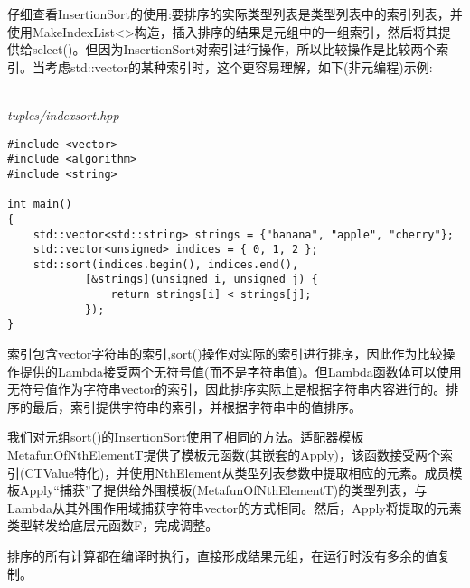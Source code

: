 仔细查看InsertionSort的使用:要排序的实际类型列表是类型列表中的索引列表，并使用MakeIndexList<>构造，插入排序的结果是元组中的一组索引，然后将其提供给select()。但因为InsertionSort对索引进行操作，所以比较操作是比较两个索引。当考虑std::vector的某种索引时，这个更容易理解，如下(非元编程)示例:

\hspace*{\fill} \\ %
\noindent
\textit{tuples/indexsort.hpp}
\begin{lstlisting}[style=styleCXX]
#include <vector>
#include <algorithm>
#include <string>

int main()
{
	std::vector<std::string> strings = {"banana", "apple", "cherry"};
	std::vector<unsigned> indices = { 0, 1, 2 };
	std::sort(indices.begin(), indices.end(),
			[&strings](unsigned i, unsigned j) {
				return strings[i] < strings[j];
			});
}
\end{lstlisting}

索引包含vector字符串的索引,sort()操作对实际的索引进行排序，因此作为比较操作提供的Lambda接受两个无符号值(而不是字符串值)。但Lambda函数体可以使用无符号值作为字符串vector的索引，因此排序实际上是根据字符串内容进行的。排序的最后，索引提供字符串的索引，并根据字符串中的值排序。

我们对元组sort()的InsertionSort使用了相同的方法。适配器模板MetafunOfNthElementT提供了模板元函数(其嵌套的Apply)，该函数接受两个索引(CTValue特化)，并使用NthElement从类型列表参数中提取相应的元素。成员模板Apply“捕获”了提供给外围模板(MetafunOfNthElementT)的类型列表，与Lambda从其外围作用域捕获字符串vector的方式相同。然后，Apply将提取的元素类型转发给底层元函数F，完成调整。

排序的所有计算都在编译时执行，直接形成结果元组，在运行时没有多余的值复制。

















